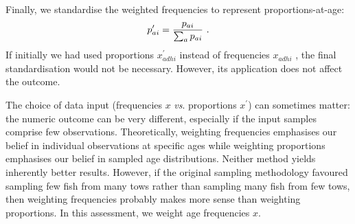 \documentclass[11pt]{book}\usepackage[]{graphicx}\usepackage[]{color}
\newcommand{\eqn}[1]{\begin{equation}#1\end{equation}}
\newcommand{\gfrac}[2]{\genfrac{}{}{}{0}{#1}{#2}}
\begin{document}
Finally, we standardise the weighted frequencies to represent proportions-at-age:
%
\eqn{p_{ai}^\prime = \gfrac{p_{ai}}{\sum_{a} p_{ai}}~.}
%
If initially we had used proportions $x_{adhi}^\prime$ instead of frequencies $x_{adhi}$ , the final standardisation would not be necessary. However, its application does not affect the outcome.\\
\bigskip

The choice of data input (frequencies $x$ \emph{vs}. proportions $x^\prime$) can sometimes matter: the numeric outcome can be very different, especially if the input samples comprise few observations. Theoretically, weighting frequencies emphasises our belief in individual observations at specific ages while weighting proportions emphasises our belief in sampled age distributions. Neither method yields inherently better results. However, if the original sampling methodology favoured sampling few fish from many tows rather than sampling many fish from few tows, then weighting frequencies probably makes more sense than weighting proportions. In this assessment, we weight age frequencies $x$.

\newpage

\end{document}
